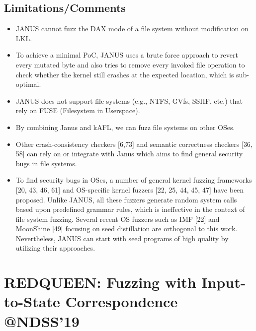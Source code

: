 \subsection{Limitations/Comments}
\begin{itemize}
    \item JANUS cannot fuzz the DAX mode of a file system without modification on LKL. 
    \item To achieve a minimal PoC, JANUS uses a brute force approach to revert every mutated byte and also tries to remove every invoked file operation to check whether the kernel still crashes at the expected location, which is sub-optimal.
    \item JANUS does not support file systems (e.g., NTFS, GVfs, SSHF, etc.) that rely on FUSE (Filesystem in Userspace).
    \item By combining Janus and kAFL, we can fuzz file systems on other OSes.
    \item Other crash-consistency checkers [6,73] and semantic correctness checkers [36, 58] can rely on or integrate with Janus which aims to find general security bugs in file systems.
    \item To find security bugs in OSes, a number of general kernel fuzzing frameworks [20, 43, 46, 61] and OS-specific kernel fuzzers [22, 25, 44, 45, 47] have been proposed. Unlike JANUS, all these fuzzers generate random system calls based upon predefined grammar rules, which is ineffective in the context of file system fuzzing. Several recent OS fuzzers such as IMF [22] and MoonShine [49] focusing on seed distillation are orthogonal to this work. Nevertheless, JANUS can start with seed programs of high quality by utilizing their approaches.
\end{itemize}
\newpage

\section{REDQUEEN: Fuzzing with Input-to-State Correspondence \\@NDSS'19}
